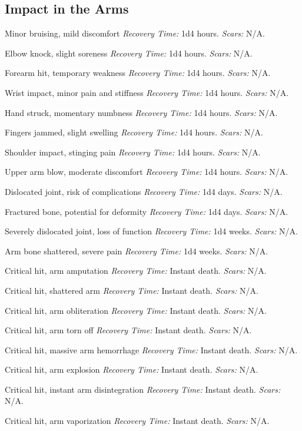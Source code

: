\subsection{Impact in the Arms}

\begin{description}[labelwidth=1.5em, leftmargin=*, itemsep=0.4em]
    \item[1 -] Minor bruising, mild discomfort \textit{Recovery Time:} 1d4 hours. \textit{Scars:} N/A.
    \item[2 -] Elbow knock, slight soreness \textit{Recovery Time:} 1d4 hours. \textit{Scars:} N/A.
    \item[3 -] Forearm hit, temporary weakness \textit{Recovery Time:} 1d4 hours. \textit{Scars:} N/A.
    \item[4 -] Wrist impact, minor pain and stiffness \textit{Recovery Time:} 1d4 hours. \textit{Scars:} N/A.
    \item[5 -] Hand struck, momentary numbness \textit{Recovery Time:} 1d4 hours. \textit{Scars:} N/A.
    \item[6 -] Fingers jammed, slight swelling \textit{Recovery Time:} 1d4 hours. \textit{Scars:} N/A.
    \item[7 -] Shoulder impact, stinging pain \textit{Recovery Time:} 1d4 hours. \textit{Scars:} N/A.
    \item[8 -] Upper arm blow, moderate discomfort \textit{Recovery Time:} 1d4 hours. \textit{Scars:} N/A.
    \item[9 -] Dislocated joint, risk of complications \textit{Recovery Time:} 1d4 days. \textit{Scars:} N/A.
    \item[10 -] Fractured bone, potential for deformity \textit{Recovery Time:} 1d4 days. \textit{Scars:} N/A.
    \item[11 -] Severely dislocated joint, loss of function \textit{Recovery Time:} 1d4 weeks. \textit{Scars:} N/A.
    \item[12 -] Arm bone shattered, severe pain \textit{Recovery Time:} 1d4 weeks. \textit{Scars:} N/A.
    \item[13 -] Critical hit, arm amputation \textit{Recovery Time:} Instant death. \textit{Scars:} N/A.
    \item[14 -] Critical hit, shattered arm \textit{Recovery Time:} Instant death. \textit{Scars:} N/A.
    \item[15 -] Critical hit, arm obliteration \textit{Recovery Time:} Instant death. \textit{Scars:} N/A.
    \item[16 -] Critical hit, arm torn off \textit{Recovery Time:} Instant death. \textit{Scars:} N/A.
    \item[17 -] Critical hit, massive arm hemorrhage \textit{Recovery Time:} Instant death. \textit{Scars:} N/A.
    \item[18 -] Critical hit, arm explosion \textit{Recovery Time:} Instant death. \textit{Scars:} N/A.
    \item[19 -] Critical hit, instant arm disintegration \textit{Recovery Time:} Instant death. \textit{Scars:} N/A.
    \item[20 -] Critical hit, arm vaporization \textit{Recovery Time:} Instant death. \textit{Scars:} N/A.
\end{description}

